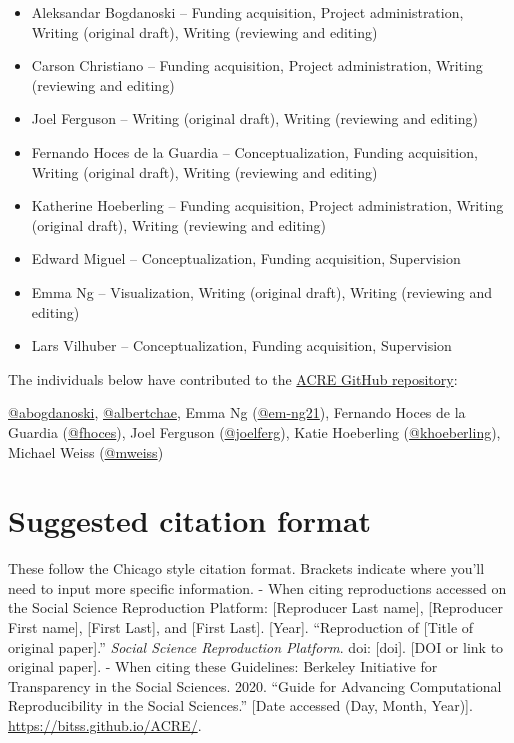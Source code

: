 \documentclass[]{book}
\providecommand{\tightlist}{%
  \setlength{\itemsep}{0pt}\setlength{\parskip}{0pt}}
\begin{document}
\begin{itemize}
\tightlist
\item
  Aleksandar Bogdanoski -- Funding acquisition, Project administration, Writing (original draft), Writing (reviewing and editing)
\item
  Carson Christiano -- Funding acquisition, Project administration, Writing (reviewing and editing)
\item
  Joel Ferguson -- Writing (original draft), Writing (reviewing and editing)
\item
  Fernando Hoces de la Guardia -- Conceptualization, Funding acquisition, Writing (original draft), Writing (reviewing and editing)
\item
  Katherine Hoeberling -- Funding acquisition, Project administration, Writing (original draft), Writing (reviewing and editing)
\item
  Edward Miguel -- Conceptualization, Funding acquisition, Supervision
\item
  Emma Ng -- Visualization, Writing (original draft), Writing (reviewing and editing)
\item
  Lars Vilhuber -- Conceptualization, Funding acquisition, Supervision
\end{itemize}

The individuals below have contributed to the \href{https://github.com/BITSS/ACRE}{ACRE GitHub repository}:

\href{https://github.com/abogdanoski}{@abogdanoski}, \href{https://github.com/albertchae}{@albertchae}, Emma Ng (\href{https://github.com/em-ng21}{@em-ng21}), Fernando Hoces de la Guardia (\href{https://github.com/fhoces}{@fhoces}), Joel Ferguson (\href{https://github.com/joelferg}{@joelferg}), Katie Hoeberling (\href{https://github.com/khoeberling}{@khoeberling}), Michael Weiss (\href{https://github.com/mweiss}{@mweiss})

\hypertarget{suggested-citation-format}{%
\section{Suggested citation format}\label{suggested-citation-format}}

These follow the Chicago style citation format. Brackets \protect\hyperlink{section}{} indicate where you'll need to input more specific information.
- When citing reproductions accessed on the Social Science Reproduction Platform: {[}Reproducer Last name{]}, {[}Reproducer First name{]}, {[}First Last{]}, and {[}First Last{]}. {[}Year{]}. ``Reproduction of {[}Title of original paper{]}.'' \emph{Social Science Reproduction Platform}. doi: {[}doi{]}. {[}DOI or link to original paper{]}.
- When citing these Guidelines: Berkeley Initiative for Transparency in the Social Sciences. 2020. ``Guide for Advancing Computational Reproducibility in the Social Sciences.'' {[}Date accessed (Day, Month, Year){]}. \url{https://bitss.github.io/ACRE/}.
\end{document}
